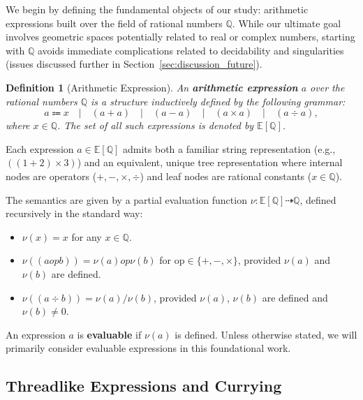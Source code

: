 \documentclass[12pt]{article}
\newtheorem{definition}{Definition}[section]
\begin{document}
We begin by defining the fundamental objects of our study: arithmetic expressions built over the field of rational numbers \( \mathbb{Q} \). While our ultimate goal involves geometric spaces potentially related to real or complex numbers, starting with \( \mathbb{Q} \) avoids immediate complications related to decidability and singularities (issues discussed further in Section~\ref{sec:discussion_future}). %

\begin{definition}[Arithmetic Expression]\label{def:arithmetic_expression_cs}
An \textbf{arithmetic expression} \( a \) over the rational numbers \( \mathbb{Q} \) is a structure inductively defined by the following grammar:
\begin{equation*}
a \Coloneqq x \quad | \quad (a + a) \quad | \quad (a - a) \quad | \quad (a \times a) \quad | \quad (a \div a),
\end{equation*}
where \( x \in \mathbb{Q} \). The set of all such expressions is denoted by \( \mathbb{E}[\mathbb{Q}] \).
\end{definition}

Each expression \( a \in \mathbb{E}[\mathbb{Q}] \) admits both a familiar string representation (e.g., \( ((1+2)\times 3) \)) and an equivalent, unique tree representation where internal nodes are operators (\(+, -, \times, \div\)) and leaf nodes are rational constants (\(x \in \mathbb{Q}\)).

The semantics are given by a partial evaluation function \( \nu: \mathbb{E}[\mathbb{Q}] \dashrightarrow \mathbb{Q} \), defined recursively in the standard way:
\begin{itemize}
    \item \( \nu(x) = x \) for any \( x \in \mathbb{Q} \).
    \item \( \nu((a \mathbin{op} b)) = \nu(a) \mathbin{op} \nu(b) \) for \( \mathrm{op} \in \{+, -, \times\} \), provided \( \nu(a) \) and \( \nu(b) \) are defined.
    \item \( \nu((a \div b)) = \nu(a) / \nu(b) \), provided \( \nu(a) \), \( \nu(b) \) are defined and \( \nu(b) \neq 0 \).
\end{itemize}
An expression \( a \) is \textbf{evaluable} if \( \nu(a) \) is defined. Unless otherwise stated, we will primarily consider evaluable expressions in this foundational work.

\subsection{Threadlike Expressions and Currying} %
\end{document}
